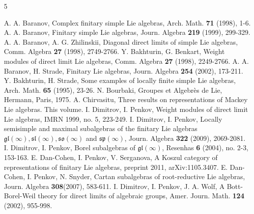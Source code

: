 \documentclass{svmult}
\newcommand{\so}{\mathfrak{so}}
\renewcommand{\sp}{\mathfrak{sp}}
\renewcommand{\sl}{\mathfrak{sl}}
\newcommand{\gl}{\mathfrak{gl}}
\begin{document}
\begin{thebibliography}{5}

 A. A. Baranov, Complex finitary simple Lie algebras, Arch. Math. \textbf{71} (1998), 1-6.
\vspace{0.2cm}
 A. A. Baranov, Finitary simple Lie algebras, Journ. Algebra \textbf{219} (1999), 299-329.
\vspace{0.2cm}
 A. A. Baranov, A. G. Zhilinskii, Diagonal direct limits of simple Lie algebras, Comm. Algebra \textbf{27} (1998), 2749-2766.
\vspace{0.2cm}
 Y. Bakhturin, G. Benkart, Weight modules of direct limit Lie algebras, Comm. Algebra \textbf{27} (1998), 2249-2766.
\vspace{0.2cm}
 A. A. Baranov, H. Strade, Finitary Lie algebras, Journ. Algebra \textbf{254} (2002), 173-211.
\vspace{0.2cm}
 Y. Bakhturin, H. Strade, Some examples of locally finite simple Lie algebras, Arch. Math. \textbf{65} (1995), 23-26.
\vspace{0.2cm}
 N. Bourbaki, Groupes et Algebr\`{e}s de Lie, Hermann, Paris, 1975.
\vspace{0.2cm}
 A. Chirvasitu, Three results on representations of Mackey Lie algebras. This volume.
\vspace{0.2cm}
 I. Dimitrov, I. Penkov, Weight modules of direct limit Lie algebras, IMRN 1999, no. 5, 223-249.
\vspace{0.2cm}
 I. Dimitrov, I. Penkov, Locally semisimple and maximal subalgebras of the finitary Lie algebras $\mathfrak{gl}(\infty), \sl(\infty), \so(\infty)$ and $\sp(\infty)$, Journ. Algebra \textbf{322} (2009), 2069-2081.  
\vspace{0.2cm}
 I. Dimitrov, I. Penkov, Borel subalgebras of $\gl(\infty)$, Resenhas \textbf{6} (2004), no. 2-3, 153-163.
\vspace{0.2cm}
 E. Dan-Cohen, I. Penkov, V. Serganova, A Koszul category of representations of finitary Lie algebras, preprint 2011, arXiv:1105.3407.
\vspace{0.2cm}
 E. Dan-Cohen, I. Penkov, N. Snyder, Cartan subalgebras of root-reductive Lie algebras, Journ. Algebra \textbf{308}(2007), 583-611.
\vspace{0.2cm}
 I. Dimitrov, I. Penkov, J. A. Wolf, A Bott-Borel-Weil theory for direct limits of algebraic groups, Amer. Journ. Math. \textbf{124} (2002), 955-998.

\end{thebibliography}
\end{document}
